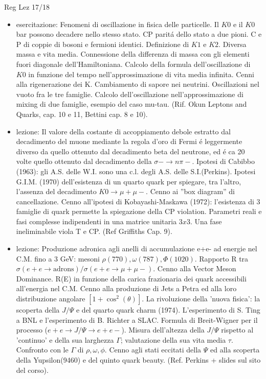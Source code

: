 \begin{frame}[allowframebreaks]{Reg Lez 17/18}
\begin{itemize}
\item esercitazione: Fenomeni di oscillazione in fisica delle particelle. Il $K0$ e il $K0$bar possono decadere nello stesso stato. CP parit\'a dello stato a due pioni. C e P di coppie di bosoni e fermioni identici. Definizione di $K1$ e $K2$. Diversa massa e vita media. Connessione della differenza di massa con gli elementi fuori diagonale dell'Hamiltoniana. Calcolo della formula dell'oscillazione di $K0$ in funzione del tempo nell'approssimazione di vita media infinita. Cenni alla rigenerazione dei K. Cambiamento di sapore nei neutrini. Oscillazioni nel vuoto fra le tre famiglie. Calcolo dell'oscillazione nell'approssimazione di mixing di due famiglie, esempio del caso mu-tau. (Rif. Okun Leptons and Quarks, cap. 10 e 11, Bettini cap. 8 e 10).
\item lezione: Il valore della costante di accoppiamento debole estratto dal decadimento del muone mediante la regola d'oro di Fermi \'e leggermente diverso da quello ottenuto dal decadimento beta del neutrone, ed \'e ca 20 volte quello ottenuto dal decadimento della $\sigma-\to n\pi-$. Ipotesi di Cabibbo (1963): gli A.S. delle W.I. sono una c.l. degli A.S. delle S.I.(Perkins). Ipotesi G.I.M. (1970) dell'esistenza di un quarto quark per spiegare, tra l'altro, l'assenza del decadimento $K0\to\mu+\mu-$. Cenno ai ''box diagram'' di cancellazione. Cenno all'ipotesi di Kobayashi-Maskawa (1972): l'esistenza di 3 famiglie di quark permette la spiegazione della CP violation. Parametri reali e fasi complesse indipendenti in una matrice unitaria $3x3$. Una fase ineliminabile viola T e CP. (Ref Griffiths Cap. 9).
\item  lezione: Produzione adronica agli anelli di accumulazione e+e- ad energie nel C.M. fino a 3 GeV: mesoni $\rho(770),\omega(787),\Phi(1020)$. Rapporto R tra $\sigma(e+e\to\text{adrons})/\sigma(e+e\to\mu+\mu-)$. Cenno alla Vector Meson Dominance. R(E) in funzione della carica frazionaria dei quark accessibili all'energia nel C.M. Cenno alla produzione di Jets a Petra ed alla loro distribuzione angolare $[1+\cos^2(\theta)]$. La rivoluzione della 'nuova fisica': la scoperta della $J/\Psi$ e del quarto quark charm (1974). L'esperimento di S. Ting a BNL e l'esperimento di B. Richter a SLAC. Formula di Breit-Wigner per il processo ($e+e\to J/\Psi\to e+e-$). Misura dell'altezza della $J/\Psi$ rispetto al 'continuo' e della sua larghezza $\Gamma$; valutazione della sua vita media $\tau$. Confronto con le $\Gamma$ di $\rho,\omega,\phi$. Cenno agli stati eccitati della $\Psi$ ed alla scoperta della Yupsilon(9460) e del quinto quark beauty. (Ref. Perkins + slides sul sito del corso).

\end{itemize}
\end{frame}
